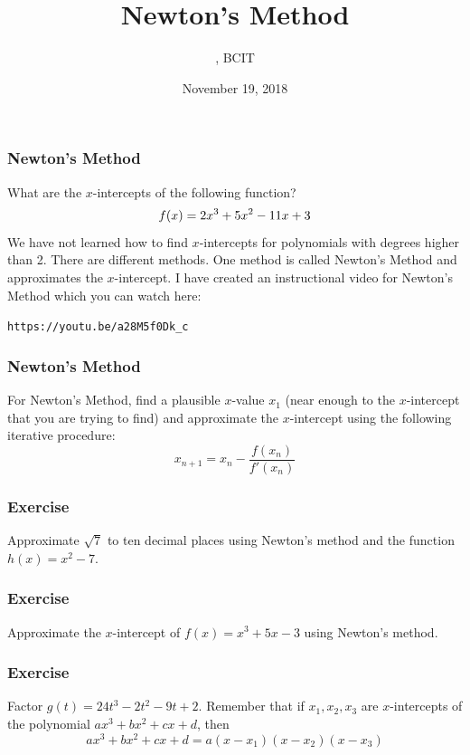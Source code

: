 \documentclass[xcolor=dvipsnames]{beamer}
\title{Newton's Method}
\subtitle{{\CourseNumber}, BCIT}
\author{\CourseName}
\date{November 19, 2018}
\begin{document}
\begin{frame}
  \titlepage
\end{frame}


\begin{frame}
  \frametitle{Newton's Method}
What are the $x$-intercepts of the following function?
\begin{equation}
  \label{eq:ietaicie}
f(x)=2x^{3}+5x^{2}-11x+3\notag
\end{equation}
We have not learned how to find $x$-intercepts for polynomials with
degrees higher than 2. There are different methods. One method is
called \alert{Newton's Method} and approximates the $x$-intercept. I
have created an instructional video for Newton's Method which you can
watch here:
\begin{alltt}
https://youtu.be/a28M5f0Dk\_c
\end{alltt}
\end{frame}

\begin{frame}
  \frametitle{Newton's Method}
For Newton's Method, find a plausible $x$-value $x_{1}$ (near enough
to the $x$-intercept that you are trying to find) and approximate the
$x$-intercept using the following iterative procedure:
\begin{equation}
  \label{eq:heimioje}
  x_{n+1}=x_{n}-\frac{f(x_{n})}{f'(x_{n})}
\end{equation}
\end{frame}

\begin{frame}
  \frametitle{Exercise}
{\ubung} Approximate $\sqrt{7}$ to ten decimal places using Newton's
  method and the function $h(x)=x^{2}-7$. 
\end{frame}

\begin{frame}
  \frametitle{Exercise}
{\ubung} Approximate the $x$-intercept of $f(x)=x^{3}+5x-3$ using
  Newton's method. %
\end{frame}

\begin{frame}
  \frametitle{Exercise}
{\ubung} Factor $g(t)=24t^{3}-2t^{2}-9t+2$. Remember that if $x_{1},x_{2},x_{3}$ 
  are $x$-intercepts of the polynomial $ax^{3}+bx^{2}+cx+d$, then
  \begin{equation}
    \label{eq:ahsuagha}
    ax^{3}+bx^{2}+cx+d=a(x-x_{1})(x-x_{2})(x-x_{3})
  \end{equation}
\end{frame}
\end{document}
